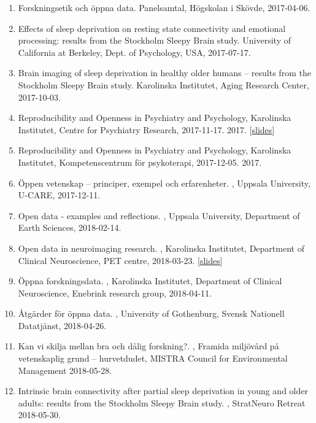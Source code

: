 \documentclass[10pt,a4paper,twocolumn]{article}
\begin{document}
\begin{enumerate}
    \item Forskningsetik och öppna data. Panelsamtal, Högskolan i Skövde, 2017-04-06.

    \item Effects of sleep deprivation on resting state connectivity and emotional processing: results from the Stockholm Sleepy Brain study. University of California at Berkeley, Dept. of Psychology, USA, 2017-07-17.

    \item Brain imaging of sleep deprivation in healthy older humans – results from the Stockholm Sleepy Brain study. Karolinska Institutet, Aging Research Center, 2017-10-03.

    \item Reproducibility and Openness in Psychiatry and Psychology, Karolinska Institutet, Centre for Psychiatry Research, 2017-11-17. 2017. [\href{https://osf.io/6zu3s/}{slides}]

    \item Reproducibility and Openness in Psychiatry and Psychology, Karolinska Institutet, Kompetenscentrum för psykoterapi, 2017-12-05. 2017.

    \item Öppen vetenskap – principer, exempel och erfarenheter. , Uppsala University, U-CARE, 2017-12-11.

    \item Open data - examples and reflections. , Uppsala University, Department of Earth Sciences, 2018-02-14.

    \item Open data in neuroimaging research. , Karolinska Institutet, Department of Clinical Neuroscience, PET centre, 2018-03-23. [\href{https://osf.io/s8bep/}{slides}]

    \item Öppna forskningsdata. , Karolinska Institutet, Department of Clinical Neuroscience, Enebrink research group, 2018-04-11.

    \item Åtgärder för öppna data. , University of Gothenburg, Svensk Nationell Datatjänst, 2018-04-26.

    \item Kan vi skilja mellan bra och dålig forskning?. , Framida miljövård på vetenskaplig grund – hurvetdudet, MISTRA Council for Environmental Management 2018-05-28.

    \item Intrinsic brain connectivity after partial sleep deprivation in young and older adults: results from the Stockholm Sleepy Brain study. , StratNeuro Retreat 2018-05-30.


\end{enumerate}
\end{document}
